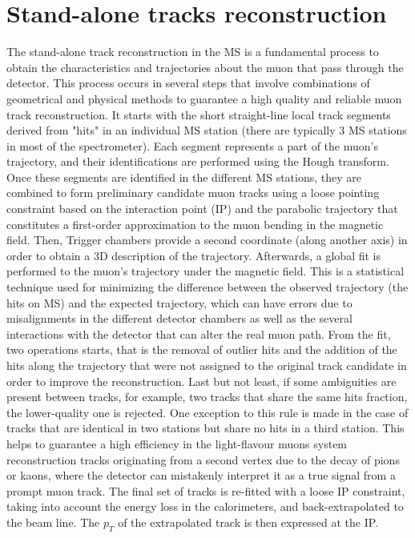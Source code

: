\documentclass[11pt,a4paper,twoside,openright]{report}
\begin{document}
\section{Stand-alone tracks reconstruction}
The stand-alone track reconstruction in the MS is a fundamental process to obtain the characteristics and trajectories about the muon that pass through the detector. This process occurs in several steps that involve combinations of geometrical and physical methods to guarantee a high quality and reliable muon track reconstruction. It starts with the short straight-line local track segments derived from "hits" in an individual MS station (there are typically 3 MS stations in most of the spectrometer). Each segment represents a part of the muon's trajectory, and their identifications are performed using the Hough transform. Once these segments are identified in the different MS stations, they are combined to form preliminary candidate muon tracks using a loose pointing constraint based on the interaction point (IP) and the parabolic trajectory that constitutes a first-order approximation to the muon bending in the magnetic field. Then, Trigger chambers provide a second coordinate (along another axis) in order to obtain a 3D description of the trajectory. Afterwards, a  global fit is performed to the muon's trajectory under the magnetic field. This is a statistical technique used for minimizing the difference between the observed trajectory (the hits on MS) and the expected trajectory, which can have errors due to misalignments in the different detector chambers as well as the several interactions with the detector that can alter the real muon path. From the fit, two operations starts, that is the removal of outlier hits and the addition of the hits along the trajectory that were not assigned to the original track candidate in order to improve the reconstruction. Last but not least, if some ambiguities are present between tracks, for example, two tracks that share the same hits fraction, the lower-quality one is rejected. One exception to this rule is made in the case of tracks that are identical in two stations but share no hits in a third station. This helps to guarantee a high efficiency in the light-flavour muons system reconstruction tracks originating from a second vertex due to the decay of pions or kaons, where the detector can mistakenly interpret it as a true signal from a prompt muon track. The final set of tracks is re-fitted with a loose IP constraint, taking into account the energy loss in the calorimeters, and back-extrapolated to the beam line. The \( p_T \) of the extrapolated track is then expressed at the IP.
\end{document}
